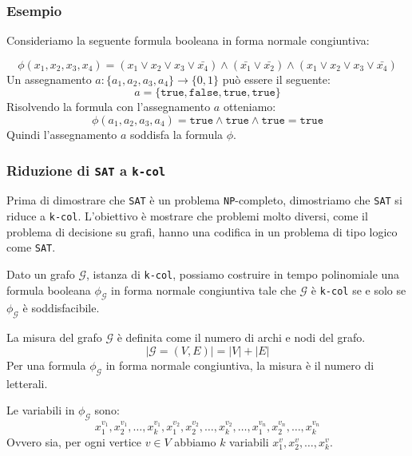 \subsubsection{Esempio}
Consideriamo la seguente formula booleana in forma normale congiuntiva:

\[
\phi(x_1, x_2, x_3, x_4) = (x_1 \lor x_2 \lor x_3 \lor \bar{x_4}) \land 
(\bar{x_1} \lor \bar{x_2}) \land (x_1 \lor x_2 \lor x_3 \lor \bar{x_4})
\]
Un assegnamento $a: \{a_1, a_2, a_3, a_4\} \to \{0, 1\}$ può essere il seguente:
\[
a = \{\texttt{true}, \texttt{false}, \texttt{true}, \texttt{true}\}
\]
Risolvendo la formula con l'assegnamento $a$ otteniamo:
\[
\phi(a_1, a_2, a_3, a_4) = \texttt{true} \land \texttt{true} \land \texttt{true} = \texttt{true}
\]
Quindi l'assegnamento $a$ soddisfa la formula $\phi$.

\subsubsection{Riduzione di \texttt{SAT} a \texttt{k-col}}
Prima di dimostrare che \texttt{SAT} è un problema \texttt{NP}-completo, dimostriamo
che \texttt{SAT} si riduce a \texttt{k-col}. L'obiettivo è mostrare che problemi molto 
diversi, come il problema di decisione su grafi, hanno una codifica in un problema 
di tipo logico come \texttt{SAT}.
\begin{tcolorbox}
    Dato un grafo $\mathcal{G}$, istanza di \texttt{k-col}, possiamo costruire in 
    tempo polinomiale una formula booleana $\phi_\mathcal{G}$ in forma normale congiuntiva
    tale che $\mathcal{G}$ è \texttt{k-col} se e solo se $\phi_\mathcal{G}$ è soddisfacibile.
\end{tcolorbox}
La misura del grafo $\mathcal{G}$ è definita come il numero di archi e nodi del grafo.
\[
    |\mathcal{G}=(V, E)| = |V| + |E|  
\]
Per una formula $\phi_\mathcal{G}$ in forma normale congiuntiva, la misura è il numero
    di letterali.

    Le variabili in $\phi_\mathcal{G}$ sono:
    \[
        x_1^{v_1}, x_2^{v_1}, \dots, x_k^{v_1}, x_1^{v_2},
        x_2^{v_2}, \dots, x_k^{v_2}, \dots, x_1^{v_n}, x_2^{v_n}, \dots, x_k^{v_n}
    \]
    Ovvero sia, per ogni vertice $v \in V$ abbiamo $k$ variabili $x_1^v, x_2^v, \dots, x_k^v$.
    

